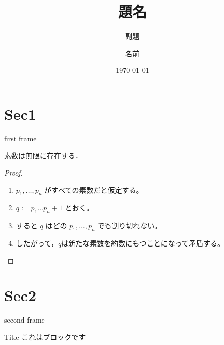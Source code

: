 \documentclass[%
  unicode,
  dvipdfmx,
  mathserif,
  m, %
  aspectratio=169,
  10pt,
]{beamer}
\title{ 題名 }
\subtitle{ 副題 }
\author{ 名前 }
\institute{ 所属ゼミ }
\date{\today}
\begin{document}
\maketitle
\section*{Sec1}
\begin{frame}{first frame}
\begin{theorem}
  素数は無限に存在する．
\end{theorem}
\begin{proof}
  \begin{enumerate}
    \item<1-> $p_1, \dots, p_n$ がすべての素数だと仮定する。
    \item<2-> $q:=p_1\dots p_n + 1$ とおく。
    \item<3-> すると $q$ はどの $p_1,\dots,p_n$ でも割り切れない。
    \item<4-> したがって，$q$は新たな素数を約数にもつことになって矛盾する。\qedhere
  \end{enumerate}
\end{proof}
\end{frame}
\section*{Sec2}
\begin{frame}{second frame}
\begin{block}{Title}
  これはブロックです
\end{block}
\end{frame}
\end{document}
